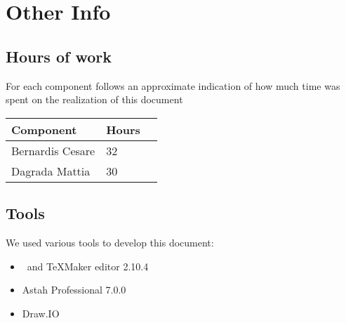 \section{Other Info}
\subsection{Hours of work}
	For each component follows an approximate indication of how much time was
	spent on the realization of this document
	\begin{center}
		\begin{tabular}{ | l | l | p{5cm} |}
			\hline
			Component & Hours 					\\ \hline
			Bernardis Cesare & 32 				\\ \hline
			Dagrada Mattia & 30  				\\ \hline
			\end{tabular}
			\end{center}
			
\subsection{Tools}
	We used various tools to develop this document:
	\begin{itemize}
		\item \LaTeXe \, and TeXMaker editor 2.10.4
		\item Astah Professional 7.0.0
		\item Draw.IO
	\end{itemize}